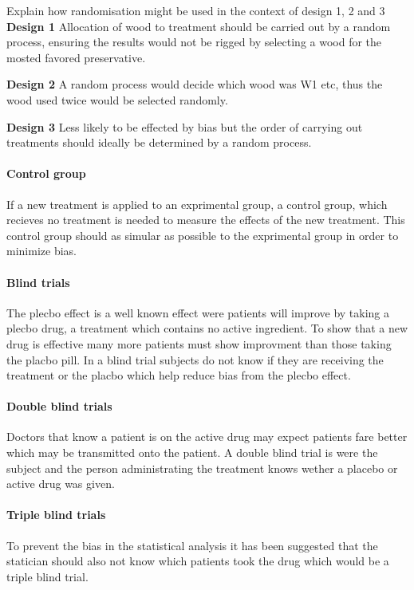 \begin{example}
            \begin{step}{Explain how randomisation might be used in the context of design 1, 2 and 3}
            \textbf{Design 1} Allocation of wood to treatment should be carried out by a random process, ensuring the results would not be rigged by selecting a wood for the mosted favored preservative.
            
            \textbf{Design 2} A random process would decide which wood was W1 etc, thus the wood used twice would be selected randomly.

            \textbf{Design 3} Less likely to be effected by bias but the order of carrying out treatments should ideally be determined by a random process. 
            \end{step}
        \end{example}

        \paragraph{Control group}
        If a new treatment is applied to an exprimental group, a control group, which recieves no treatment is needed to measure the effects of the new treatment. This control group should as simular as possible to the exprimental group in order to minimize bias.

        \paragraph{Blind trials}
        The plecbo effect is a well known effect were patients will improve by taking a plecbo drug, a treatment which contains no active ingredient. To show that a new drug is effective many more patients must show improvment than those taking the placbo pill. In a blind trial subjects do not know if they are receiving the treatment or the placbo which help reduce bias from the plecbo effect. 
        
        \paragraph{Double blind trials} Doctors that know a patient is on the active drug may expect patients fare better which may be transmitted onto the patient. A double blind trial is were the subject and the person administrating the treatment knows wether a placebo or active drug was given.

        \paragraph{Triple blind trials} To prevent the bias in the statistical analysis it has been suggested that the statician should also not know which patients took the drug which would be a triple blind trial.

